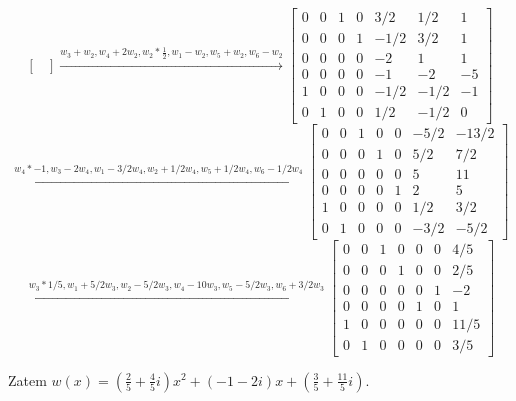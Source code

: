 \documentclass[]{sinol}
\begin{document}
\begin{zadanie}
\[\begin{bmatrix}
        \end{bmatrix}
        \xrightarrow[]{w_3+w_2, w_4+2w_2, w_2*\frac{1}{2}, w_1-w_2, w_5+w_2, w_6-w_2}
        \begin{bmatrix}
            0  & 0 &  1  & 0 & 3/2  & 1/2 & 1 \\ 
            0  &  0 &  0  &  1 & -1/2  & 3/2 & 1 \\
            0  &  0 &  0  &  0 & -2  & 1 & 1 \\
            0  &  0 & 0  &  0 & -1  & -2 & -5 \\
            1  &  0 &  0  &  0 & -1/2  & -1/2 & -1 \\
            0  &  1 &  0  &  0 & 1/2  & -1/2 & 0
        \end{bmatrix}
        \]
        \[
        \xrightarrow[]{w_4*-1, w_3-2w_4, w_1-3/2w_4, w_2+1/2w_4, w_5+1/2w_4, w_6-1/2w_4}
        \begin{bmatrix}
            0  & 0 &  1  & 0 & 0  & -5/2 & -13/2 \\ 
            0  &  0 &  0  &  1 & 0  & 5/2 & 7/2 \\
            0  &  0 &  0  &  0 & 0  & 5 & 11 \\
            0  &  0 & 0  &  0 & 1  & 2 & 5 \\
            1  &  0 &  0  &  0 & 0  & 1/2 & 3/2 \\
            0  &  1 &  0  &  0 & 0  & -3/2 & -5/2
        \end{bmatrix}
        \]
        \[
        \xrightarrow[]{w_3*1/5, w_1+5/2w_3, w_2-5/2w_3, w_4-10w_3, w_5-5/2w_3, w_6+3/2w_3}
        \begin{bmatrix}
            0  & 0 &  1  & 0 & 0  & 0 & 4/5 \\ 
            0  &  0 &  0  &  1 & 0  & 0 & 2/5 \\
            0  &  0 &  0  &  0 & 0  & 1 & -2 \\
            0  &  0 & 0  &  0 & 1  & 0 & 1 \\
            1  &  0 &  0  &  0 & 0  & 0 & 11/5 \\
            0  &  1 &  0  &  0 & 0  & 0 & 3/5
        \end{bmatrix}
        \]

        Zatem $w(x) = (\frac{2}{5}+\frac{4}{5}i)x^2 + (-1-2i)x+(\frac{3}{5}+\frac{11}{5}i)$.
    \end{zadanie}
    \begin{zadanie}
        
    \end{zadanie}
\end{document}
